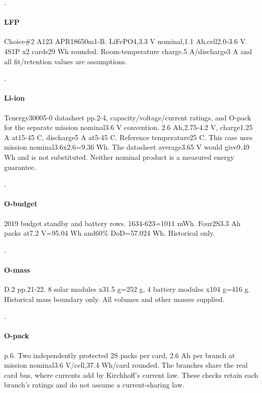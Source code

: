 \citep{kyutech2021birdsicd}.

\paragraph{LFP} Choice\#2 A123 APR18650m1-B. LiFePO4,\allowbreak{}3.3 V nominal,\allowbreak{}1.1 Ah,\allowbreak{}cell2.0-3.6 V. 4S1P x2 cards29 Wh rounded. Room-temperature charge.5 A/discharge3 A and all fit/retention values are assumptions.

\citep{oresatbatteryresearch}.

\paragraph{Li-ion} Tenergy30005-0 datasheet pp.2-4,\allowbreak{} capacity/voltage/current ratings,\allowbreak{} and O-pack for the separate mission nominal3.6 V convention. 2.6 Ah,\allowbreak{}2.75-4.2 V,\allowbreak{} charge1.25 A at15-45 C,\allowbreak{} discharge5 A at5-45 C. Reference temperature25 C. This case uses mission nominal3.6x2.6=9.36 Wh. The datasheet average3.65 V would give9.49 Wh and is not substituted. Neither nominal product is a measured energy guarantee.

\citep{cots-mission_tenergy_30005_0_ds}.

\paragraph{O-budget} 2019 budget standby and battery rows. 1634-623=1011 mWh. Four2S3.3 Ah packs at7.2 V=95.04 Wh and60\% DoD=57.024 Wh. Historical only.

\citep{oresat2019powerbudget}.

\paragraph{O-mass} D.2 pp.21-22. 8 solar modules x31.5 g=252 g,\allowbreak{} 4 battery modules x104 g=416 g. Historical mass boundary only. All volumes and other masses supplied.

\citep{oresat2016csli}.

\paragraph{O-pack} p.6. Two independently protected 2S packs per card,\allowbreak{} 2.6 Ah per branch at mission nominal3.6 V/cell,\allowbreak{}37.4 Wh/card rounded. The branches share the real card bus,\allowbreak{} where currents add by Kirchhoff's current law. These checks retain each branch's ratings and do not assume a current-sharing law.

